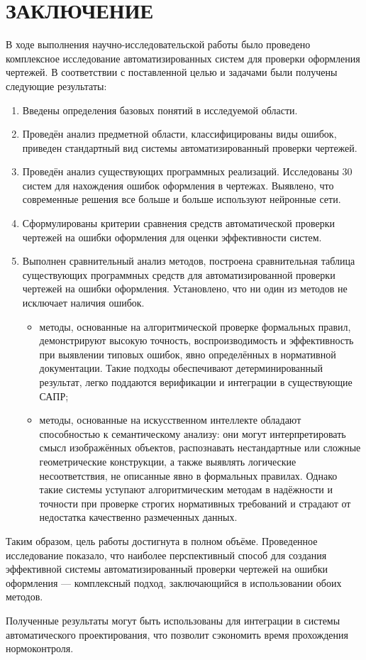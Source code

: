 \section*{ЗАКЛЮЧЕНИЕ}

В ходе выполнения научно-исследовательской работы было проведено комплексное исследование автоматизированных систем
для проверки оформления чертежей.
В соответствии с поставленной целью и задачами были получены следующие результаты:

\begin{enumerate}
\item Введены определения базовых понятий в исследуемой области.
\item Проведён анализ предметной области, классифицированы виды ошибок, приведен стандартный вид системы автоматизированный проверки чертежей.
\item Проведён анализ существующих программных реализаций. Исследованы 30 систем для нахождения ошибок оформления в чертежах. Выявлено, что современные решения все больше и больше используют нейронные сети.
\item Сформулированы критерии сравнения средств автоматической проверки чертежей на ошибки оформления для оценки эффективности систем.
\item Выполнен сравнительный анализ методов, построена сравнительная таблица существующих программных средств для автоматизированной проверки чертежей на ошибки оформления. Установлено, что ни один из методов не исключает наличия ошибок.
    \begin{itemize}
        \item методы, основанные на алгоритмической проверке формальных правил, демонстрируют высокую точность, воспроизводимость и эффективность при выявлении типовых ошибок, явно определённых в нормативной документации. Такие подходы обеспечивают детерминированный результат, легко поддаются верификации и интеграции в существующие САПР;
        \item методы, основанные на искусственном интеллекте обладают способностью к семантическому анализу: они могут интерпретировать смысл изображённых объектов, распознавать нестандартные или сложные геометрические конструкции, а также выявлять логические несоответствия, не описанные явно в формальных правилах. Однако такие системы уступают алгоритмическим методам в надёжности и точности при проверке строгих нормативных требований и страдают от недостатка качественно размеченных данных.
    \end{itemize}
\end{enumerate}

Таким образом, цель работы достигнута в полном объёме. Проведенное исследование показало, что наиболее перспективный способ для создания эффективной
системы автоматизированный проверки чертежей на ошибки оформления --- комплексный подход, заключающийся в использовании обоих методов.

Полученные результаты могут быть использованы для интеграции в системы автоматического проектирования, что позволит сэкономить время прохождения нормоконтроля.
\clearpage
